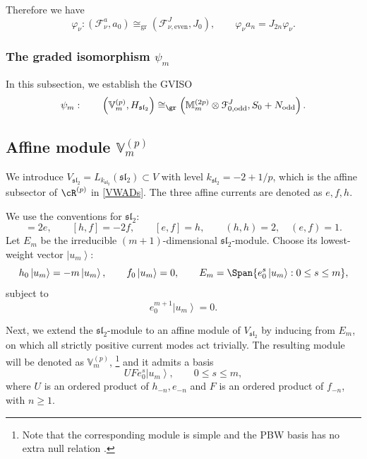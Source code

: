 \documentclass[a4paper,11pt]{article}
\theoremstyle{definition}
\theoremstyle{definition}
\theoremstyle{remark}
\newcommand{\ket}[1]{\ensuremath{\left|#1\right\rangle}}
\newcommand{\be}{\begin{equation}}
\newcommand{\ee}{\end{equation}}
\begin{document}
Therefore we have
\be \label{varphinus}
\varphi_\nu :\left(\mathcal{F}_\nu^a, a_0\right) \cong_\text{gr} (\mathcal{F}_{\nu,\mathrm{even}}^J, J_0), \qquad \varphi_\nu a_n = J_{2n} \varphi_\nu. 
\ee


 \subsubsection{The   graded   isomorphism $\psi_m$  }\label{psimbij}

In this subsection, we establish the GVISO
\be
\psi_m: \qquad
\left(\mathbb V_m^{(p)},H_{\mathfrak{sl}_2}\right)
\cong_{\gr}
\left(\mathbb M_m^{(2p)}\otimes\mathcal F^J_{0,\mathrm{odd}},
S_0+N_{\mathrm{odd}}\right).
\ee

\subsection*{Affine module $\mathbb V_m^{(p)}$}

 
We introduce $ V_{\mathfrak{sl}_2}  =L_{k_{\mathfrak{sl}_2}}(\mathfrak{sl}_2)\subset V $ with level   $k_{\mathfrak{sl}_2}=-2+1/p$, which  is the affine subsector of $\cR^{(p)}$ in \eqref{VWADs}.  The three affine currents are denoted as $e,f,h$.

  We use the conventions for ${\mathfrak{sl}_2}$:
\be
[h,e]=2e,\qquad [h,f]=-2f,\qquad [e,f]=h,
\qquad (h,h)=2,\quad(e,f)=1.
\ee
Let $E_m$ be the irreducible $(m+1)$-dimensional
$\mathfrak{sl}_2$-module. Choose its lowest-weight vector $\ket{u_m}$:
\be\label{efhu}
h_0\ket{u_m}=-m\ket{u_m},\qquad f_0\ket{u_m}=0,
\qquad E_m=\Span\{e_0^s\ket{u_m}:0\leq s\leq m\},
\ee
 subject to
\be
e_0^{m+1}\ket{u_m}=0.
\label{eq:horizontal-null}
\ee


Next, we extend the $\mathfrak{sl}_2$-module to an affine module of  $ V_{\mathfrak{sl}_2} $ by inducing from $E_m$,  on which    all strictly positive current modes act trivially. The resulting module will be denoted as $\mathbb V_m^{(p)}$, \footnote{Note that the corresponding module is simple and the PBW basis has no extra null relation \cite{Adamovic:2025efe}. } and it admits a basis 
\be
UF e_0^s\ket{u_m},\qquad 0\leq s\leq m,
\label{eq:affine-basis}
\ee
where $U$ is an ordered product of  $h_{-n},e_{-n}$ and $F$  is an ordered product of  $f_{-n}$, with   $n\geq1$.
\end{document}
